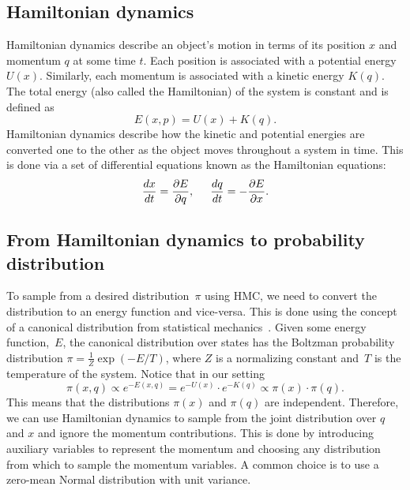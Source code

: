 \documentclass[letterpaper, 10 pt, conference]{ieeeconf}  %
\begin{document}
\subsection{Hamiltonian dynamics}
Hamiltonian dynamics describe an object's motion in terms of its position $x$ and momentum $q$ at some time $t$. 
Each position is associated with a potential energy $U(x)$.
Similarly, each momentum is associated with a kinetic energy $K(q)$.
The total energy (also called the Hamiltonian) of the system is constant and is defined as
$$
E(x, p) = U(x) + K(q).
$$
Hamiltonian dynamics describe how the kinetic and potential energies are converted one to the other as the object moves throughout a system in time. 
This is done via a set of differential equations known as the Hamiltonian equations:
$$
\frac{dx}{dt} = \frac{\partial E}{\partial q}, 
\hspace{5mm}
\frac{dq}{dt} = - \frac{\partial E}{\partial x}. $$
%

\subsection{From Hamiltonian dynamics to probability distribution}
To sample from a desired distribution~$\pi$ using HMC, we need to convert the distribution to an energy function and vice-versa. This is done using the concept of a canonical distribution from statistical mechanics~\cite{N11}. Given some energy function,~$E$, the canonical distribution over states has the Boltzman probability distribution $\pi = \frac{1}{Z}\exp (-E/T)$, where $Z$ is a normalizing constant and~$T$ is the temperature of the system.
Notice that in our setting
$$
\pi(x,q) 
\propto e^{-E(x,q)} 
= e^{-U(x)} \cdot e^{-K(q)}
\propto \pi(x) \cdot \pi(q).
$$
This means that the distributions $\pi(x)$ and $\pi(q)$ are independent. Therefore, we can use Hamiltonian dynamics to sample from the joint distribution over $q$ and $x$ and ignore the momentum contributions.
This is done by introducing auxiliary variables to represent the momentum and choosing any distribution from which to sample the momentum variables. A common choice is to use a zero-mean Normal distribution with unit variance.
\end{document}
